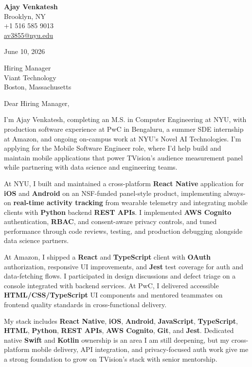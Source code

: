 \documentclass[letterpaper,11pt]{article}
\begin{document}
\begin{flushleft}
\textbf{\large Ajay Venkatesh} \\
Brooklyn, NY \\
+1 516 585 9013 \\
\href{mailto:av3855@nyu.edu}{av3855@nyu.edu}
\end{flushleft}
\vspace{10pt}
June 10, 2026
\vspace{6pt}

Hiring Manager \\
Viant Technology \\
Boston, Massachusetts

\vspace{10pt}

Dear Hiring Manager,

I'm Ajay Venkatesh, completing an M.S. in Computer Engineering at NYU, with production software experience at PwC in Bengaluru, a summer SDE internship at Amazon, and ongoing on-campus work at NYU's Novel AI Technologies. I'm applying for the Mobile Software Engineer role, where I'd help build and maintain mobile applications that power TVision's audience measurement panel while partnering with data science and engineering teams.

At NYU, I built and maintained a cross-platform \textbf{React Native} application for \textbf{iOS} and \textbf{Android} on an NSF-funded panel-style product, implementing always-on \textbf{real-time activity tracking} from wearable telemetry and integrating mobile clients with \textbf{Python} backend \textbf{REST APIs}. I implemented \textbf{AWS Cognito} authentication, \textbf{RBAC}, and consent-aware privacy controls, and tuned performance through code reviews, testing, and production debugging alongside data science partners.

At Amazon, I shipped a \textbf{React} and \textbf{TypeScript} client with \textbf{OAuth} authorization, responsive UI improvements, and \textbf{Jest} test coverage for auth and data-fetching flows. I participated in design discussions and defect triage on a console integrated with backend services. At PwC, I delivered accessible \textbf{HTML/CSS/TypeScript} UI components and mentored teammates on frontend quality standards in cross-functional delivery.

My stack includes \textbf{React Native}, \textbf{iOS}, \textbf{Android}, \textbf{JavaScript}, \textbf{TypeScript}, \textbf{HTML}, \textbf{Python}, \textbf{REST APIs}, \textbf{AWS Cognito}, \textbf{Git}, and \textbf{Jest}. Dedicated native \textbf{Swift} and \textbf{Kotlin} ownership is an area I am still deepening, but my cross-platform mobile delivery, API integration, and privacy-focused auth work give me a strong foundation to grow on TVision's stack with senior mentorship.
\end{document}
